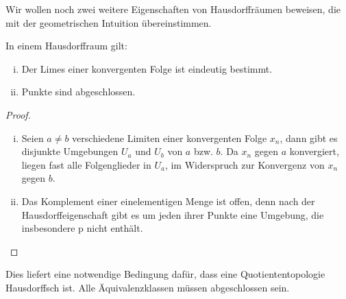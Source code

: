 \documentclass[a4paper,10pt]{scrartcl}
\begin{document}
Wir wollen noch zwei weitere Eigenschaften von Hausdorffräumen beweisen, die mit der geometrischen Intuition übereinstimmen.
\begin{st}
In einem Hausdorffraum gilt:
\begin{enumerate}[(i)]
\item Der Limes einer konvergenten Folge ist eindeutig bestimmt.
\item Punkte sind abgeschlossen.
\end{enumerate}
\end{st}
\begin{proof}
\begin{enumerate}[(i)]
\item Seien $ a\neq b $ verschiedene Limiten einer konvergenten Folge $ x_n $, dann gibt es disjunkte Umgebungen $ U_a $ und $ U_b $ von $ a $ bzw. $ b $.  Da $ x_n $ gegen $ a $ konvergiert, liegen fast alle Folgenglieder in $ U_a $, im Widerspruch zur Konvergenz von $ x_n $ gegen $ b $.
\item Das Komplement einer einelementigen Menge ist offen, denn nach der Hausdorffeigenschaft gibt es um jeden ihrer Punkte eine Umgebung, die insbesondere p nicht enthält.
\end{enumerate}
\end{proof}
\fixme[fig18]
\begin{note*}
Dies liefert eine notwendige Bedingung dafür, dass eine Quotiententopologie Hausdorffsch ist.  Alle Äquivalenzklassen müssen abgeschlossen sein.
\end{note*}
\end{document}
